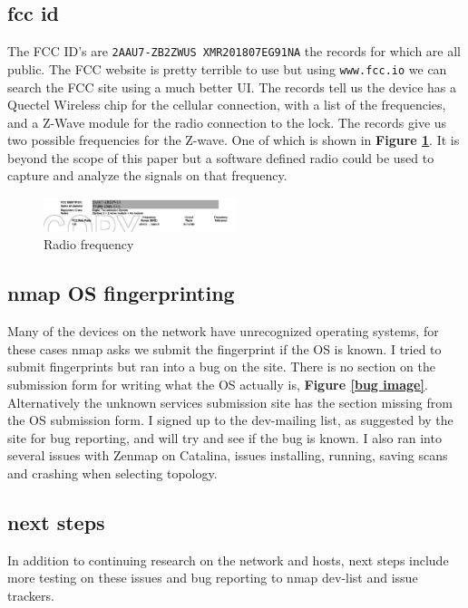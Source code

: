 \documentclass[10pt]{article}
\begin{document}
\subsection*{fcc id}
The FCC ID's are \verb|2AAU7-ZB2ZWUS XMR201807EG91NA| the records for which are all public. The FCC website is pretty terrible to use but using
\verb|www.fcc.io| we can search the FCC site using a much better UI. The records tell us the device has a Quectel Wireless chip for the cellular connection, with a list of
the frequencies, and a Z-Wave module for the radio connection to the lock.\cite{fcc} The records give us two possible frequencies for the Z-wave. One of which is shown in
\textbf{Figure \ref{radio image}}. It is beyond the scope of this paper but a software defined radio could be used to capture and analyze the signals on that frequency.

\begin{figure}[H]
\centering
\includegraphics[width=0.5\textwidth]{images/radio.png}
\caption{Radio frequency}\label{radio image}
\end{figure}

\subsection*{nmap OS fingerprinting}
Many of the devices on the network have unrecognized operating systems, for these cases nmap asks we submit the fingerprint if the OS is known. I tried to submit 
fingerprints but ran into a bug on the site. There is no section on the submission form for writing what the OS actually is, \textbf{Figure \ref{bug image}}. 
Alternatively the unknown services submission site has the section missing from the OS submission form. I signed up to the dev-mailing list, as suggested by the site for bug 
reporting, and will try and see if the bug is known.\cite{submit} I also ran into several issues with Zenmap on Catalina, issues installing, running, saving scans and crashing
when selecting topology.

\medskip

\subsection*{next steps}
In addition to continuing research on the network and hosts, next steps include more testing on these issues and bug reporting to nmap dev-list and issue
trackers.
\end{document}
